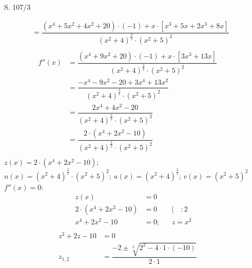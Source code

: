 \begin{Exercise}{S. 107/3}{}
\begin{enumerate}
\begin{enumerate}[label=\alph*),leftmargin=*]
{\begin{itemize}[leftmargin=*]
{\begin{align*}
                        &= \dfrac{\left(x^{4} + 5 x^{2} + 4x^{2} + 20\right) \cdot \left(-1\right) + x \cdot \left[x^{3} + 5x + 2x^{3} + 8x\right]}{\left(x^{2} + 4\right)^{\frac{3}{2}} \cdot \left(x^{2} + 5 \right)^{2}} &&\\[-2.0ex]
                    \end{align*}
                    \begin{align*}
                        f''(x) &= \dfrac{\left(x^{4} + 9 x^{2} + 20\right) \cdot \left(-1\right) + x \cdot \left[3x^{3} + 13x\right]}{\left(x^{2} + 4\right)^{\frac{3}{2}} \cdot \left(x^{2} + 5 \right)^{2}} &&\\[2.0ex]
                        &= \dfrac{-x^{4} - 9 x^{2} - 20 + 3x^{4} + 13x^{2}}{\left(x^{2} + 4\right)^{\frac{3}{2}} \cdot \left(x^{2} + 5 \right)^{2}} &&\\[2.0ex]
                        &= \dfrac{2x^{4} + 4x^{2} - 20}{\left(x^{2} + 4\right)^{\frac{3}{2}} \cdot \left(x^{2} + 5 \right)^{2}} &&\\[2.0ex]
                        &= \dfrac{2 \cdot \left(x^{4} + 2x^{2} - 10\right)}{\left(x^{2} + 4\right)^{\frac{3}{2}} \cdot \left(x^{2} + 5 \right)^{2}} &&\\[-2.0ex]
                    \end{align*}
                    $z(x) = 2 \cdot \left(x^{4} + 2x^{2} - 10\right)$; \\[1.0ex]
                    $n(x) = \left(x^{2} + 4\right)^{\frac{3}{2}} \cdot \left(x^{2} + 5 \right)^{2}$; \qquad $u(x) = \left(x^{2} + 4\right)^{\frac{3}{2}}$; \qquad $v(x) = \left(x^{2} + 5 \right)^{2}$\\[1.0ex]
                    $f''(x) = 0:$\\[-1.0ex]
                    \vspace{-2.0ex}
                    \begin{align*}
                        z(x) &= 0 \\[2.0ex]
                        2 \cdot \left(x^{4} + 2x^{2} - 10\right) &= 0 &&| \quad :2\\[1.5ex]
                        x^{4} + 2x^{2} - 10 &= 0; && z = x^{2}\\[-1.5ex]
                    \end{align*}
                    \begin{align*}
                        z^{2} + 2z - 10 &= 0 &&\\[2.0ex]
                        z_{1,2} &= \dfrac{-2 \pm \sqrt[2]{2^{2} - 4 \cdot 1 \cdot \left(-10\right)}}{2 \cdot 1} && \\[2.0ex]

\end{align*}}
\end{itemize}}
\end{enumerate}
\end{enumerate}
\end{Exercise}
